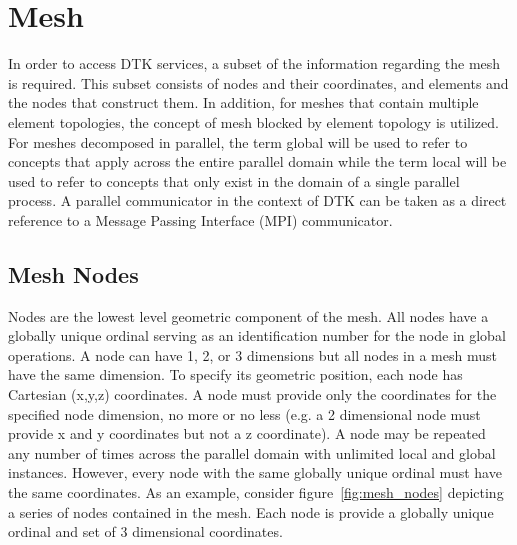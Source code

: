 \documentclass[letterpaper,12pt]{article}
\begin{document}
\clearpage

\section{Mesh}\label{sec:mesh}
In order to access DTK services, a subset of the information regarding
the mesh is required. This subset consists of nodes and their
coordinates, and elements and the nodes that construct them. In
addition, for meshes that contain multiple element topologies, the
concept of mesh blocked by element topology is utilized. For meshes
decomposed in parallel, the term global will be used to refer to
concepts that apply across the entire parallel domain while the term
local will be used to refer to concepts that only exist in the domain
of a single parallel process. A parallel communicator in the context
of DTK can be taken as a direct reference to a Message Passing
Interface (MPI) communicator.

\subsection{Mesh Nodes}\label{subsec:nodes}
Nodes are the lowest level geometric component of the mesh. All nodes
have a globally unique ordinal serving as an identification number for
the node in global operations. A node can have 1, 2, or 3 dimensions
but all nodes in a mesh must have the same dimension. To specify its
geometric position, each node has Cartesian (x,y,z) coordinates. A
node must provide only the coordinates for the specified node
dimension, no more or no less (e.g. a 2 dimensional node must provide
x and y coordinates but not a z coordinate). A node may be repeated
any number of times across the parallel domain with unlimited local
and global instances. However, every node with the same globally
unique ordinal must have the same coordinates. As an example, consider
figure~\ref{fig:mesh_nodes} depicting a series of nodes contained in
the mesh. Each node is provide a globally unique ordinal and set of 3
dimensional coordinates.
\end{document}
